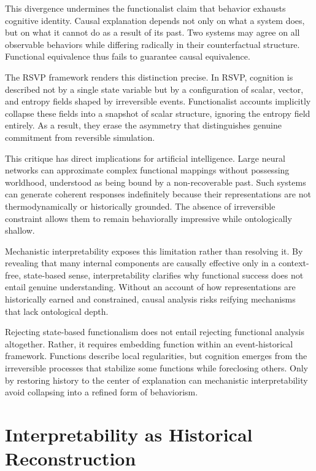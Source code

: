 \documentclass[11pt]{article}
\begin{document}
This divergence undermines the functionalist claim that behavior exhausts
cognitive identity. Causal explanation depends not only on what a system does,
but on what it cannot do as a result of its past. Two systems may agree on all
observable behaviors while differing radically in their counterfactual
structure. Functional equivalence thus fails to guarantee causal equivalence.

The RSVP framework renders this distinction precise. In RSVP, cognition is
described not by a single state variable but by a configuration of scalar,
vector, and entropy fields shaped by irreversible events. Functionalist accounts
implicitly collapse these fields into a snapshot of scalar structure, ignoring
the entropy field entirely. As a result, they erase the asymmetry that
distinguishes genuine commitment from reversible simulation.

This critique has direct implications for artificial intelligence. Large neural
networks can approximate complex functional mappings without possessing
worldhood, understood as being bound by a non-recoverable past. Such systems can
generate coherent responses indefinitely because their representations are not
thermodynamically or historically grounded. The absence of irreversible
constraint allows them to remain behaviorally impressive while ontologically
shallow.

Mechanistic interpretability exposes this limitation rather than resolving it.
By revealing that many internal components are causally effective only in a
context-free, state-based sense, interpretability clarifies why functional
success does not entail genuine understanding. Without an account of how
representations are historically earned and constrained, causal analysis risks
reifying mechanisms that lack ontological depth.

Rejecting state-based functionalism does not entail rejecting functional
analysis altogether. Rather, it requires embedding function within an
event-historical framework. Functions describe local regularities, but cognition
emerges from the irreversible processes that stabilize some functions while
foreclosing others. Only by restoring history to the center of explanation can
mechanistic interpretability avoid collapsing into a refined form of
behaviorism.

\section{Interpretability as Historical Reconstruction}
\end{document}
